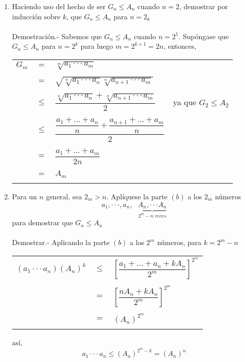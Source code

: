 \begin{enumerate}
\begin{enumerate}[\bfseries (a)]
             \item Haciendo uso del hecho de ser $G_n \leq A_n$ cuando $n=2$, demostrar por inducción sobre $k$, que $G_n \leq A_n$ para $n=2_k$\\\\
		 Demostración.- \; Sabemos que $G_n \leq A_n$ cuando $n=2^1$. Supóngase que $G_n \leq A_n$ para $n=2^k$ para luego $m=2^{k+1}=2n$, entonces,
		  \begin{center}
		      \begin{tabular}{rcll}
			  $G_m$&$=$&$\sqrt[m]{a_1 \cdot \cdot \cdot a_m}$&\\\\
			  &$=$&$\sqrt{\sqrt[n]{a_1 \cdot \cdot \cdot a_n} \sqrt[n]{a_{n+1}\cdot \cdot \cdot a_m}}$&\\\\
			  &$\leq$&$\dfrac{\sqrt[n]{a_1 \cdot \cdot \cdot a_n} + \sqrt[n]{a_{n+1}\cdot \cdot \cdot a_m}}{2}$& ya que $G_2 \leq A_2$\\\\
			  &$\leq$&$\dfrac{\dfrac{a_1 + ... + a_n}{n} + \dfrac{a_{n+1} + ... + a_m}{n}}{2}$&\\\\
			  &$=$&$\dfrac{a_1 + ... + a_m}{2n}$&\\\\
			  &$=$&$A_m$&\\\\
		      \end{tabular}
		  \end{center}

             \item Para un $n$ general, sea $2_m>n.$ Aplíquese la parte $(b)$ a los $2_m$ números 
                $$a_1,\cdot \cdot \cdot , a_n,\,\,\,\, \underbrace{A_n,\cdot \cdot \cdot A_n}_{{2^{m}-n \;veces}}$$
                para demostrar que $G_n \leq A_n$\\\\
		  Demostrar.- \; Aplicando la parte $(b)$  a los $2^m$ números, para $k=2^m-n$
		  \begin{center}
		      \begin{tabular}{rcl}
			  $(a_1 \cdot \cdot \cdot a_n)(A_n)^k$&$\leq$&$\left[\dfrac{a_1 + ... + a_n + k A_n}{2^m}\right]^{2^m}$\\\\
			  &$=$&$\left[\dfrac{n A_n + k A_n}{2^m}\right]^{2^m}$\\\\
			  &$=$&$(A_n)^{2^m}$\\\\
		      \end{tabular}
		  \end{center}
		  así,
		  $$a_1\cdot \cdot \cdot a_n \leq (A_n)^{2^m - k} = (A_n)^n$$\\\\
          \end{enumerate}


\end{enumerate}
